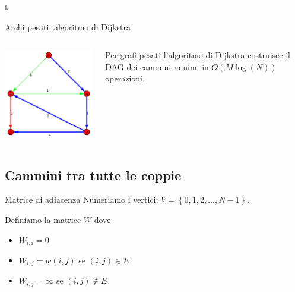 t \documentclass{beamer}
\theoremstyle{plain}
\theoremstyle{definition}
\theoremstyle{remark}
\newcommand{\set}[1]{\left\{#1\right\}}
\newcommand{\pa}[1]{\left(#1\right)}
\begin{document}
\begin{frame}{Archi pesati: algoritmo di Dijkstra}
    \begin{columns}
    \begin{column}{0.40\textwidth}
      \includegraphics[width=\textwidth]{dijkstraslide} 
    \end{column}
    \begin{column}{0.58\textwidth}
      Per grafi pesati l'algoritmo di Dijkstra costruisce il DAG dei
      cammini minimi in $O\pa{M\log \pa{N}}$ operazioni.
    \end{column}
  \end{columns}  
\end{frame}

\subsection{Cammini tra tutte le coppie}

\begin{frame}{Matrice di adiacenza}
  Numeriamo i vertici: $V = \set{ 0,1,2,..., N-1}$.
  
  \vfill
  Definiamo la matrice $W$ dove
  \begin{itemize}
  \item $W_{i,i} = 0$
  \item $W_{i,j} = w(i,j)$ se $(i,j) \in E$
  \item $W_{i,j} = \infty$ se $(i,j) \not\in E$
  \end{itemize}
 
\end{frame}
\end{document}
